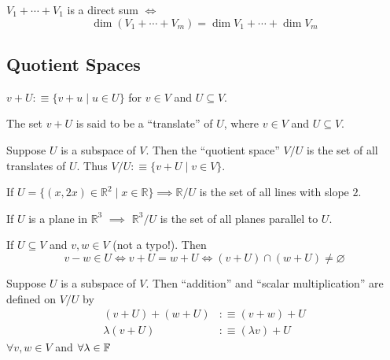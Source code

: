 \begin{thm}$V_1 + \cdots + V_1$ is a direct sum $\iff$
  \begin{equation}
    \dim (V_1+\cdots+V_m) = \dim V_1 + \cdots + \dim V_m
  \end{equation}
\end{thm}

\subsection{Quotient Spaces}

\setcounter{thm}{94}
\begin{mydef} [notation $v+U$]
  $v+U :\equiv \{v+u \mid u\in U\}$ for $v\in V$ and $U\subseteq V$.
\end{mydef}

\setcounter{thm}{96}
\begin{mydef} [translate]
  The set $v+U$ is said to be a ``translate'' of $U$, where $v\in V$ and $U \subseteq V$.
\end{mydef}

\setcounter{thm}{98}
\begin{mydef} 
  Suppose $U$ is a subspace of $V$. Then the ``quotient space'' $V/U$ is the set of all translates of $U$. Thus
  $V/U :\equiv \{v+U \mid v\in V\}$.
\end{mydef}

\begin{example}
  If $U=\{ (x,2x)\in \mathbb{R}^2 \mid x\in \mathbb{R} \} \implies \mathbb{R}/U$ is the set of all lines with slope $2$.

  If $U$ is a plane in $\mathbb{R}^3$ $\implies$ $\mathbb{R}^3/U$ is the set of all planes parallel to $U$.
\end{example}

\setcounter{thm}{100}
\begin{thm} 
  If $ U \subseteq V$ and $v,w\in V$ (not a typo!). Then
  \begin{equation}
    v-w \in U \iff v+U = w + U \iff (v+U)\cap (w+U) \neq \varnothing
  \end{equation}
\end{thm}

\begin{mydef} 
  Suppose $U$ is a subspace of $V$. Then ``addition'' and ``scalar multiplication'' are defined on $V/U$ by
  \begin{equation}
    \begin{aligned}
      (v+U)+(w+U) & :\equiv (v+w) + U \\
      \lambda (v+U) & :\equiv (\lambda v) + U
    \end{aligned}
  \end{equation}
  $\forall v,w \in V$ and $\forall \lambda \in \mathbb{F}$
\end{mydef}


